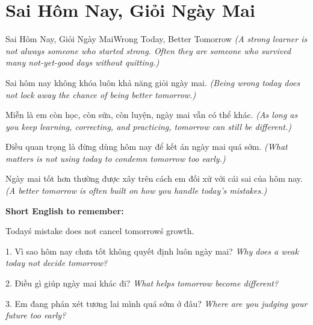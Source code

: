 \section{Sai Hôm Nay, Giỏi Ngày Mai}
\begin{truyen}{Sai Hôm Nay, Giỏi Ngày Mai}{Wrong Today, Better Tomorrow}
\textit{(A strong learner is not always someone who started strong. Often they are someone who survived many not-yet-good days without quitting.)}

Sai hôm nay không khóa luôn khả năng giỏi ngày mai.
\textit{(Being wrong today does not lock away the chance of being better tomorrow.)}

Miễn là em còn học, còn sửa, còn luyện, ngày mai vẫn có thể khác.
\textit{(As long as you keep learning, correcting, and practicing, tomorrow can still be different.)}

Điều quan trọng là đừng dùng hôm nay để kết án ngày mai quá sớm.
\textit{(What matters is not using today to condemn tomorrow too early.)}
\end{truyen}

\begin{baihoc}
Ngày mai tốt hơn thường được xây trên cách em đối xử với cái sai của hôm nay.
\textit{(A better tomorrow is often built on how you handle today's mistakes.)}
\end{baihoc}

\begin{ghinhoanh}
\textbf{Short English to remember:}

Today\'s mistake does not cancel tomorrow\'s growth.

\end{ghinhoanh}

\begin{tuhocnhanh}
1. Vì sao hôm nay chưa tốt không quyết định luôn ngày mai? \textit{Why does a weak today not decide tomorrow?}

2. Điều gì giúp ngày mai khác đi? \textit{What helps tomorrow become different?}

3. Em đang phán xét tương lai mình quá sớm ở đâu? \textit{Where are you judging your future too early?}
\end{tuhocnhanh}
\ngancach

